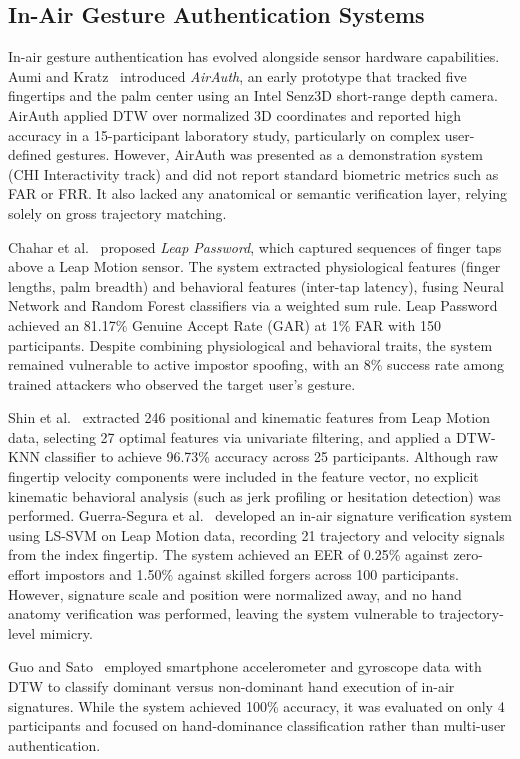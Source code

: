 \documentclass[conference]{IEEEtran}
\begin{document}
\subsection{In-Air Gesture Authentication Systems}

In-air gesture authentication has evolved alongside sensor hardware capabilities. Aumi and Kratz~\cite{airauth} introduced \textit{AirAuth}, an early prototype that tracked five fingertips and the palm center using an Intel Senz3D short-range depth camera. AirAuth applied DTW over normalized 3D coordinates and reported high accuracy in a 15-participant laboratory study, particularly on complex user-defined gestures. However, AirAuth was presented as a demonstration system (CHI Interactivity track) and did not report standard biometric metrics such as FAR or FRR. It also lacked any anatomical or semantic verification layer, relying solely on gross trajectory matching.

Chahar et al.~\cite{leappassword} proposed \textit{Leap Password}, which captured sequences of finger taps above a Leap Motion sensor. The system extracted physiological features (finger lengths, palm breadth) and behavioral features (inter-tap latency), fusing Neural Network and Random Forest classifiers via a weighted sum rule. Leap Password achieved an 81.17\% Genuine Accept Rate (GAR) at 1\% FAR with 150 participants. Despite combining physiological and behavioral traits, the system remained vulnerable to active impostor spoofing, with an 8\% success rate among trained attackers who observed the target user's gesture.

Shin et al.~\cite{dtwknn} extracted 246 positional and kinematic features from Leap Motion data, selecting 27 optimal features via univariate filtering, and applied a DTW-KNN classifier to achieve 96.73\% accuracy across 25 participants. Although raw fingertip velocity components were included in the feature vector, no explicit kinematic behavioral analysis (such as jerk profiling or hesitation detection) was performed. Guerra-Segura et al.~\cite{inairsig} developed an in-air signature verification system using LS-SVM on Leap Motion data, recording 21 trajectory and velocity signals from the index fingertip. The system achieved an EER of 0.25\% against zero-effort impostors and 1.50\% against skilled forgers across 100 participants. However, signature scale and position were normalized away, and no hand anatomy verification was performed, leaving the system vulnerable to trajectory-level mimicry.

Guo and Sato~\cite{traceablesig} employed smartphone accelerometer and gyroscope data with DTW to classify dominant versus non-dominant hand execution of in-air signatures. While the system achieved 100\% accuracy, it was evaluated on only 4 participants and focused on hand-dominance classification rather than multi-user authentication.
\end{document}

